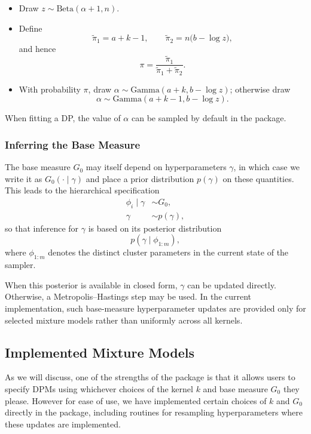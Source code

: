 \documentclass[nojss]{jss}
\begin{document}
\begin{itemize}
\item Draw $z \sim \text{Beta}(\alpha + 1, n)$.
\item Define
\[
\tilde{\pi}_1 = a + k - 1, \qquad \tilde{\pi}_2 = n\bigl(b - \log z\bigr),
\]
and hence
\[
\pi = \frac{\tilde{\pi}_1}{\tilde{\pi}_1 + \tilde{\pi}_2}.
\]
\item With probability $\pi$, draw $\alpha \sim \text{Gamma}(a + k, b - \log z)$; otherwise draw
\[
\alpha \sim \text{Gamma}(a + k - 1, b - \log z).
\]
\end{itemize}

When fitting a DP, the value of $\alpha$ can be sampled by default in the  package.

\subsubsection{Inferring the Base Measure}

The base measure $G_0$ may itself depend on hyperparameters $\gamma$, in which case we write it as $G_0(\cdot \mid \gamma)$ and place a prior distribution $p(\gamma)$ on these quantities. This leads to the hierarchical specification
\begin{align*}
\phi_i \mid \gamma &\sim G_0, \\
\gamma &\sim p(\gamma),
\end{align*}
so that inference for $\gamma$ is based on its posterior distribution
\[
p(\gamma \mid \phi_{1:m}),
\]
where $\phi_{1:m}$ denotes the distinct cluster parameters in the current state of the sampler.

When this posterior is available in closed form, $\gamma$ can be updated directly. Otherwise, a Metropolis--Hastings step may be used. In the current implementation, such base-measure hyperparameter updates are provided only for selected mixture models rather than uniformly across all kernels.



\subsection{Implemented Mixture Models} \label{subsec:implemented}
As we will discuss, one of the strengths of the  package is that it allows users to specify DPMs using whichever choices of the kernel $k$ and base measure $G_0$ they please. However for ease of use, we have implemented certain choices of $k$ and $G_0$ directly in the
package, including routines for resampling hyperparameters where these updates are implemented.
\end{document}
